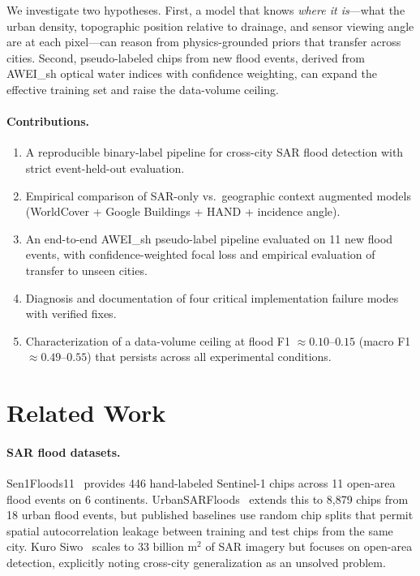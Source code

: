 \documentclass[10pt,twocolumn]{article}
\begin{document}
We investigate two hypotheses.  First, a model that knows
\emph{where it is}---what the urban density, topographic position
relative to drainage, and sensor viewing angle are at each
pixel---can reason from physics-grounded priors that transfer across
cities.  Second, pseudo-labeled chips from new flood events, derived
from AWEI\_sh optical water indices with confidence weighting, can
expand the effective training set and raise the data-volume ceiling.

\paragraph{Contributions.}
\begin{enumerate}
  \item A reproducible binary-label pipeline for cross-city SAR flood
        detection with strict event-held-out evaluation.
  \item Empirical comparison of SAR-only vs.\ geographic context
        augmented models (WorldCover + Google Buildings + HAND +
        incidence angle).
  \item An end-to-end AWEI\_sh pseudo-label pipeline evaluated on
        11 new flood events, with confidence-weighted focal loss
        and empirical evaluation of transfer to unseen cities.
  \item Diagnosis and documentation of four critical implementation
        failure modes with verified fixes.
  \item Characterization of a data-volume ceiling at flood F1
        $\approx 0.10$--$0.15$ (macro F1 $\approx 0.49$--$0.55$)
        that persists across all experimental conditions.
\end{enumerate}

\section{Related Work}

\paragraph{SAR flood datasets.}
Sen1Floods11~\cite{bonafilia2020} provides 446 hand-labeled Sentinel-1
chips across 11 open-area flood events on 6 continents.
UrbanSARFloods~\cite{zhao2024} extends this to 8,879 chips from 18
urban flood events, but published baselines use random chip splits that
permit spatial autocorrelation leakage between training and test chips
from the same city.
Kuro Siwo~\cite{yadav2024} scales to 33 billion m$^2$ of SAR imagery
but focuses on open-area detection, explicitly noting cross-city
generalization as an unsolved problem.
\end{document}
